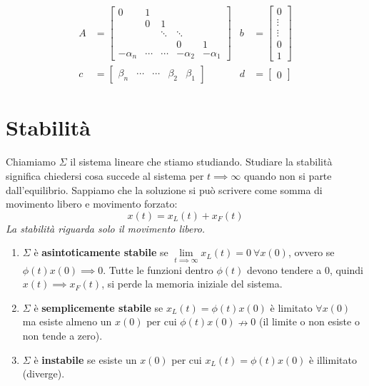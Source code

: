 \begin{equation*}
	\begin{aligned}
		A & =\begin{bmatrix}
		0          & 1      &        &            &            \\
		           & 0      & 1      &            &            \\
		           &        & \ddots & \ddots     &            \\
		           &        &        & 0          & 1          \\
		-\alpha _n & \cdots & \cdots & -\alpha _2 & -\alpha _1 
		\end{bmatrix} & b & =\begin{bmatrix}
		0\\
		\vdots \\
		\vdots \\
		0\\
		1
		\end{bmatrix}\\
		c & =\begin{bmatrix}
		\beta _n   & \cdots & \cdots & \beta _2   & \beta _1   
		\end{bmatrix} & d & =\begin{bmatrix}
		0
		\end{bmatrix}
	\end{aligned}
\end{equation*}

\chapter{Stabilità}

Chiamiamo $\Sigma $ il sistema lineare che stiamo studiando. Studiare la stabilità significa chiedersi cosa succede al sistema per $t\implies \infty $ quando non si parte dall'equilibrio. Sappiamo che la soluzione si può scrivere come somma di movimento libero e movimento forzato:
\begin{equation*}
	x\left(t\right) =x_L\left(t\right) +x_F\left(t\right)
\end{equation*}
\textit{La stabilità riguarda solo il movimento libero.}
\begin{enumerate}
	\item $\Sigma $ è \textbf{asintoticamente stabile} se $\lim\limits _{t\implies \infty } x_L\left(t\right) =0\ \forall x\left(0\right)$, ovvero se $\phi \left(t\right) x\left(0\right)\implies 0$. Tutte le funzioni dentro $\phi \left(t\right)$ devono tendere a $0$, quindi $x\left(t\right)\implies x_F\left(t\right)$, si perde la memoria iniziale del sistema.
	\item $\Sigma $ è \textbf{semplicemente stabile} se $x_L\left(t\right) =\phi \left(t\right) x\left(0\right)$ è limitato $\forall x\left(0\right)$ ma esiste almeno un $x\left(0\right)$ per cui $\phi \left(t\right) x\left(0\right) \nrightarrow 0$ (il limite o non esiste o non tende a zero).
	\item $\Sigma $ è \textbf{instabile} se esiste un $x\left(0\right)$ per cui $x_L\left(t\right) =\phi \left(t\right) x\left(0\right)$ è illimitato (diverge).
\end{enumerate}

